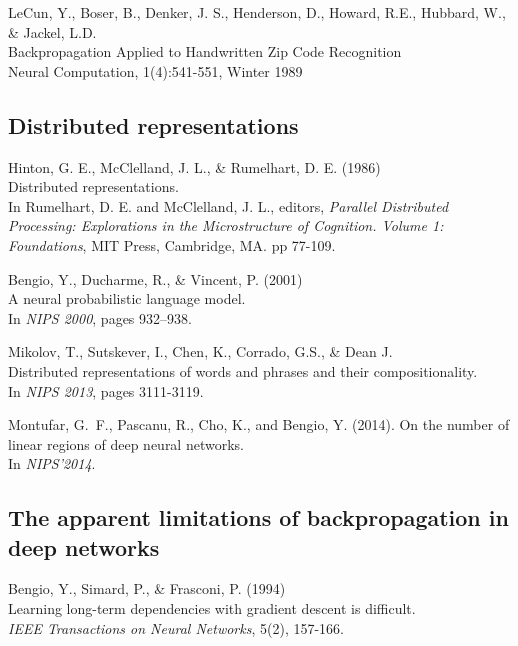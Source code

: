 \documentclass[]{article}
\begin{document}
LeCun, Y., Boser, B., Denker, J. S., Henderson, D., Howard, R.E., Hubbard,
W., \& Jackel, L.D.\\ Backpropagation Applied to Handwritten Zip Code
Recognition\\ Neural Computation, 1(4):541-551, Winter 1989

\subsection{Distributed representations}
Hinton, G. E., McClelland, J. L., \& Rumelhart, D. E. (1986)\\ Distributed
representations.\\ In Rumelhart, D. E. and McClelland, J. L., editors, {\it
  Parallel Distributed Processing: Explorations in the Microstructure of
  Cognition. Volume 1: Foundations}, MIT Press, Cambridge, MA. pp 77-109.

Bengio, Y., Ducharme, R., \& Vincent, P. (2001)\\ A neural probabilistic
language model.\\ In {\it NIPS 2000}, pages 932--938.


Mikolov, T., Sutskever, I., Chen, K., Corrado, G.S., \& Dean
J.\\ Distributed representations of words and phrases and their
compositionality.\\ In {\it NIPS 2013}, pages 3111-3119.

Montufar, G.~F., Pascanu, R., Cho, K., and Bengio, Y. (2014).  On the
number of linear regions of deep neural networks.\\ In {\it NIPS'2014}.

\subsection{The apparent limitations of backpropagation in deep networks}

Bengio, Y., Simard, P., \& Frasconi, P. (1994)\\ Learning long-term
dependencies with gradient descent is difficult.\\ {\it IEEE Transactions
  on Neural Networks}, 5(2), 157-166.
\end{document}
